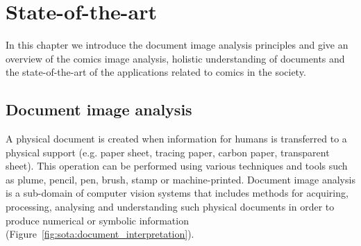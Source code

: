 \chapter{State-of-the-art} %
\label{chap:sota}
\graphicspath{{./chapters/2-sota/figs/}}




In this chapter we introduce the document image analysis principles and give an overview of the comics image analysis, holistic understanding of documents and the state-of-the-art of the applications related to comics in the society.


\section{Document image analysis} %
\label{sec:document_image_analysis}
A physical document is created when information for humans is transferred to a physical support (e.g. paper sheet, tracing paper, carbon paper, transparent sheet).
This operation can be performed using various techniques and tools such as plume, pencil, pen, brush, stamp or machine-printed.
Document image analysis is a sub-domain of computer vision systems that includes methods for acquiring, processing, analysing and understanding such physical documents in order to produce numerical or symbolic information (Figure~\ref{fig:sota:document_interpretation}).

